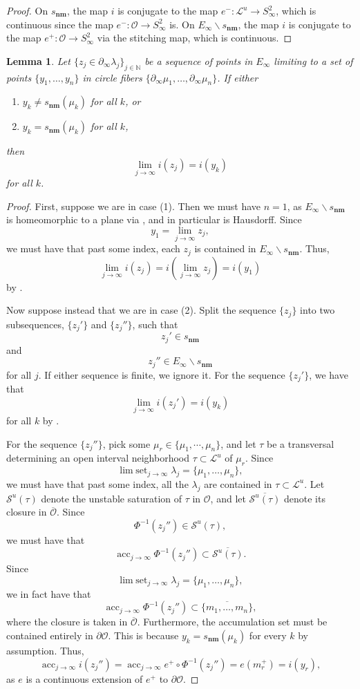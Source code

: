 \documentclass[11pt]{amsart}
\renewcommand{\l}{\lambda}
\newcommand{\mc}{\mathcal}
\newcommand{\N}{\mathbb{N}}
\newcommand{\orb}{\mathcal{O}}
\newcommand\ssm{\smallsetminus}
\newcommand{\snm}{s_\mathbf{nm}}
\DeclareMathOperator*{\limset}{\mathrm{lim}\; \mathrm{set}}
\DeclareMathOperator*{\acset}{\mathrm{acc}}
\numberwithin{equation}{section}
\newtheorem{lemma}[equation]{Lemma}
\theoremstyle{definition}
\begin{document}
\begin{proof}
	On $\snm$, the map $i$ is conjugate to the map $e^-\colon\mc L^u\to S^2_\infty$, which is continuous since the map $e^-\colon\orb\to S^2_\infty$ is. On $E_\infty\ssm\snm$, the map $i$ is conjugate to the map $e^+\colon\orb\to S^2_\infty$ via the stitching map, which is continuous.
\end{proof}

\begin{lemma}\label{lem:i_almost_cts}
	Let $\{z_j\in\partial_\infty\l_j\}_{j\in\N}$ be a sequence of points in $E_\infty$ limiting to a set of points $\{y_1,\ldots,y_n\}$ in circle fibers $\{\partial_\infty\mu_1,\ldots,\partial_\infty\mu_n\}$. If either 
	\begin{enumerate}
		\item $y_k\neq\snm(\mu_k)$ for all $k$, or
		\item $y_k=\snm(\mu_k)$ for all $k$,
	\end{enumerate}
	then 
	\[
	\lim_{j\to\infty}i(z_j)=i(y_k)
	\]
	for all $k$.
\end{lemma}

\begin{proof}
	First, suppose we are in case (1). Then we must have $n=1$, as $E_\infty\ssm\snm$ is homeomorphic to a plane via \cite[Theorem C]{buckminster2025universal}, and in particular is Hausdorff. Since
	\[
	y_1=\lim_{j\to\infty}z_j,
	\]
	we must have that past some index, each $z_j$ is contained in $E_\infty\ssm\snm$. Thus,
	\[
	\lim_{j\to\infty}i(z_j)=i\left(\lim_{j\to\infty}z_j\right)=i(y_1)
	\]
	by .
	
	Now suppose instead that we are in case (2). Split the sequence $\{z_j\}$ into two subsequences, $\{z_j'\}$ and $\{z_j''\}$, such that 
	\[
	z_j'\in \snm
	\] 
	and 
	\[
	z_j''\in E_\infty\ssm\snm
	\]
	for all $j$. If either sequence is finite, we ignore it. For the sequence $\{z_j'\}$, we have that 
	\[
	\lim_{j\to\infty}i(z_j')=i(y_k)
	\]
	for all $k$ by . 
	
	For the sequence $\{z_j''\}$, pick some $\mu_r\in\{\mu_1,\cdots,\mu_n\}$, and let $\tau$ be a transversal determining an open interval neighborhood $\tau\subset\mc L^u$ of $\mu_r$. Since 
	\[
	\limset_{j\to\infty} \l_j=\{\mu_1,\ldots,\mu_n\},
	\]
	we must have that past some index, all the $\l_j$ are contained in $\tau\subset\mc L^u$. Let $\mc S^u(\tau)$ denote the unstable saturation of $\tau$ in $\orb$, and let $\overline{\mc S^u(\tau)}$ denote its closure in $\overline{\orb}$. Since 
	\[
	\Phi^{-1}(z_j'')\in\mc S^u(\tau),
	\]
	we must have that 
	\[
	\acset_{j\to\infty}\Phi^{-1}(z_j'')\subset\overline{\mc S^u(\tau)}.
	\]
	Since 
	\[
	\limset_{j\to\infty} \l_j=\{\mu_1,\ldots,\mu_n\},
	\]
	we in fact have that 
	\[
	\acset_{j\to\infty}\Phi^{-1}(z_j'')\subset\overline{\{m_1,\ldots,m_n\}},
	\]
	where the closure is taken in $\overline{\orb}$. Furthermore, the accumulation set must be contained entirely in $\partial\orb$. This is because $y_k=\snm(\mu_k)$ for every $k$ by assumption. Thus,
	\[
	\acset_{j\to\infty}i(z_j'')=\acset_{j\to\infty}e^+\circ\Phi^{-1}(z_j'')=e(m_r^+)=i(y_r),
	\]
	as $e$ is a continuous extension of $e^+$ to $\partial\orb$.
\end{proof}
\end{document}

